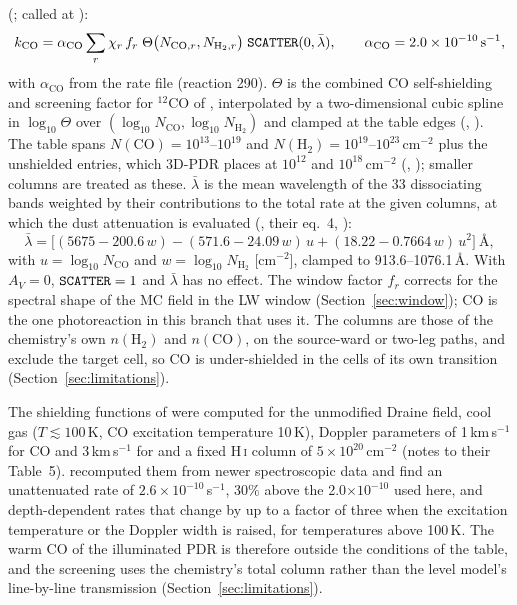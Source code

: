  (; called at
):
\begin{equation}
  k_{\mathrm{CO}} = \alpha_{\mathrm{CO}}\sum_r \chi_r\,f_r\;
     \Theta\bigl(N_{\mathrm{CO},r},N_{\mathrm{H_2},r}\bigr)\;\rtn{SCATTER}(0,\bar\lambda),
  \qquad \alpha_{\mathrm{CO}} = 2.0\times10^{-10}\unit{s^{-1}},
\end{equation}
with $\alpha_{\mathrm{CO}}$ from the rate file (reaction 290). $\Theta$ is the combined
CO self-shielding and \Htwo{} screening factor for $^{12}$CO of
\citet[their Table~5]{vanDishoeckBlack1988}, interpolated by a two-dimensional
cubic spline in $\log_{10}\Theta$ over $(\log_{10}N_{\mathrm{CO}},\log_{10}N_{\mathrm{H_2}})$ and
clamped at the table edges (, ).
The table spans $N(\mathrm{CO})=10^{13}$--$10^{19}$ and
$N(\mathrm{H_2})=10^{19}$--$10^{23}$\,cm$^{-2}$ plus the unshielded entries, which 3D-PDR
places at $10^{12}$ and $10^{18}$\,cm$^{-2}$ (,
); smaller columns are treated as these.
$\bar\lambda$ is the mean wavelength of the 33 dissociating bands weighted by
their contributions to the total rate at the given columns, at which the dust
attenuation is evaluated (, their eq.~4,
):
\begin{equation}
  \bar\lambda = \bigl[(5675-200.6\,w) - (571.6-24.09\,w)\,u + (18.22-0.7664\,w)\,u^2\bigr]\ \text{\AA},
  \label{eq:lbar}
\end{equation}
with $u=\log_{10}N_{\mathrm{CO}}$ and $w=\log_{10}N_{\mathrm{H_2}}$ [cm$^{-2}$],
clamped to 913.6--1076.1\,\AA. With $A_V=0$, $\rtn{SCATTER}=1$ and $\bar\lambda$ has
no effect. The window factor $f_r$ corrects for the spectral shape of the MC
field in the LW window (Section~\ref{sec:window}); CO is the one photoreaction
in this branch that uses it. The columns are those of the chemistry's own
$n(\mathrm{H_2})$ and $n(\mathrm{CO})$, on the source-ward or two-leg paths, and
exclude the target cell, so CO is under-shielded in the cells of its own
transition (Section~\ref{sec:limitations}).

The shielding functions of \citet{vanDishoeckBlack1988} were computed for
the unmodified Draine field, cool gas ($T\lesssim100$\,K, CO excitation
temperature 10\,K), Doppler parameters of 1\,km\,s$^{-1}$ for CO and 3\,km\,s$^{-1}$ for \Htwo{}
and a fixed H\,\textsc{i} column of $5\times10^{20}$\,cm$^{-2}$ (notes to their Table~5).
\citet{Visser2009} recomputed them from newer spectroscopic data and find an
unattenuated rate of $2.6\times10^{-10}$\,s$^{-1}$, 30\% above the 2.0$\times10^{-10}$ used
here, and depth-dependent rates that change by up to a factor of three when
the excitation temperature or the Doppler width is raised, for temperatures
above 100\,K. The warm CO of the illuminated PDR is therefore outside the
conditions of the table, and the \Htwo{} screening uses the chemistry's total
\Htwo{} column rather than the level model's line-by-line transmission
(Section~\ref{sec:limitations}).


